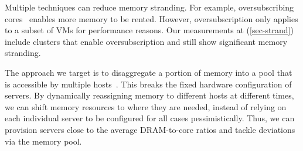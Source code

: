  Multiple
techniques can reduce memory stranding. For example,
oversubscribing cores~\cite{smartharvest.eurosys21,harvestslo.osdi20} enables more memory to be rented.
However, oversubscription only applies to a subset of VMs for performance reasons.
Our measurements at \azure (\sec\ref{sec-strand}) include
clusters that enable oversubscription and still show significant memory stranding.

The approach we target is to disaggregate a
portion of memory into a pool that is accessible by multiple
hosts~\cite{resdisagg.osdi16, fastnetdisagg.socc17,
thymesisflow.micro20}. This breaks the fixed hardware
configuration of servers.
By dynamically reassigning memory to different
hosts at different times, we can shift memory resources to where they
are needed, instead of relying on each individual server to be configured
for all cases pessimistically.
Thus, we can provision servers close to the average
DRAM-to-core ratios and tackle deviations via the memory pool.


%




